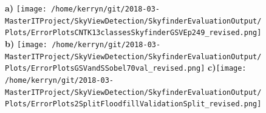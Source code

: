 \documentclass{article}
\begin{document}
\begin{figure}
\centering
\textbf{\scriptsize{a)}}
\texttt{[image: /home/kerryn/git/2018-03-MasterITProject/SkyViewDetection/SkyfinderEvaluationOutput/Plots/ErrorPlotsCNTK13classesSkyfinderGSVEp249\_revised.png]}
\textbf{\scriptsize{b)}}
\texttt{[image: /home/kerryn/git/2018-03-MasterITProject/SkyViewDetection/SkyfinderEvaluationOutput/Plots/ErrorPlotsGSVandSSobel70val\_revised.png]}
\textbf{\scriptsize{c)}}\texttt{[image: /home/kerryn/git/2018-03-MasterITProject/SkyViewDetection/SkyfinderEvaluationOutput/Plots/ErrorPlots2SplitFloodfillValidationSplit\_revised.png]}
\end{figure}

\clearpage
\end{document}
